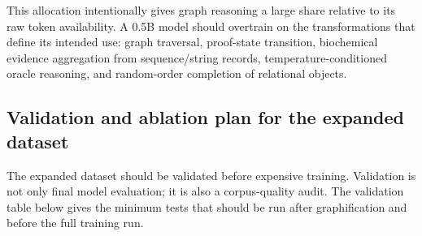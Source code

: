\documentclass[11pt]{article}
\newcommand{\1}{\mathbf{1}}
\begin{document}
This allocation intentionally gives graph reasoning a large share relative to its raw token availability. A 0.5B model should overtrain on the transformations that define its intended use: graph traversal, proof-state transition, biochemical evidence aggregation from sequence/string records, temperature-conditioned oracle reasoning, and random-order completion of relational objects.

\subsection{Validation and ablation plan for the expanded dataset}
\label{sec:expanded-validation}

The expanded dataset should be validated before expensive training. Validation is not only final model evaluation; it is also a corpus-quality audit. The validation table below gives the minimum tests that should be run after graphification and before the full training run.
\end{document}

